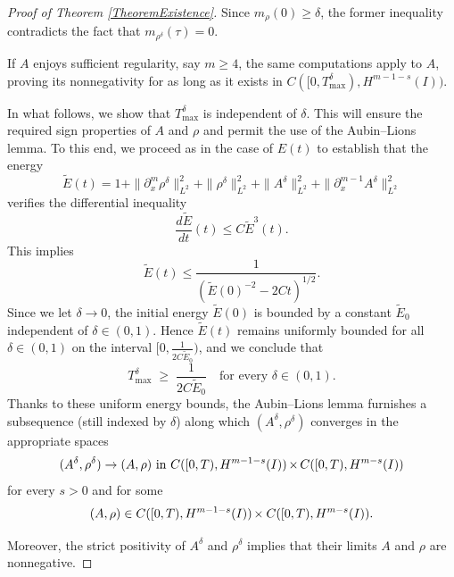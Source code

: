 \documentclass[12pt]{amsart}
\begin{document}
\begin{proof}[Proof of Theorem \ref{TheoremExistence}]
	
	Since $m_\rho(0)\geq \delta$, the former inequality contradicts the fact that $m_{\rho^\delta}(\tau)=0$.
	
	If $A$ enjoys sufficient regularity, say $m\ge4$, the same computations apply to $A$, proving its nonnegativity for as long as it exists in $C([0,T_{\max}^\delta),H^{m-1-s}(I))$. 
	

	In what follows, we show that $T_{\max}^\delta$ is independent of $\delta$. This will ensure the required sign properties of $A$ and $\rho$ and permit the use of the Aubin–Lions lemma. To this end, we proceed as in the case of $E(t)$ to establish that the energy 
	\begin{equation*}
		\tilde{E}(t)=1+\|\partial_{x}^m\rho^{\delta}\|_{L^2}^2+\|\rho^{\delta}\|_{L^2}^2+ \|A^{\delta}\|_{L^2}^2+\|\partial_x^{m-1}A^{\delta}\|_{L^2}^2
	\end{equation*}
	verifies the differential inequality
	\begin{equation*}
		\frac{d \tilde{E}}{dt}(t)\leq C \tilde{E}^3(t).
	\end{equation*}
	This implies
	\begin{equation*}
		\tilde{E}(t)\leq \frac{1}{\left( \tilde{E}(0)^{-2}-2Ct\right)^{1/2}}.
	\end{equation*}
	Since we let $\delta \to 0$, the initial energy $\tilde{E}(0)$ is bounded by a constant $\tilde{E}_0$ independent of $\delta\in(0,1)$. Hence $\tilde{E}(t)$ remains uniformly bounded for all $\delta\in(0,1)$ on the interval $\bigl[0,\tfrac{1}{2C\tilde{E}_0}\bigr)$, and we conclude that
$$
T_{\max}^\delta \;\ge\; \frac{1}{2C\tilde{E}_0}
\quad\text{for every }\delta\in(0,1).
$$
Thanks to these uniform energy bounds, the Aubin--Lions lemma furnishes a subsequence (still indexed by $\delta$) along which $(A^\delta,\rho^\delta)$ converges in the appropriate spaces
	\begin{equation}\label{Convergence2}
		(A^\delta,\rho^\delta)\to(A,\rho) \text{ in } C([0,T),H^{m-1-s}(I))\hspace{-0.03cm}\times\hspace{-0.03cm} C([0,T),H^{m-s}(I))
	\end{equation}
	for every $s>0$ and for some $$(A,\rho)\in C([0,T),H^{m-1-s}(I))\hspace{-0.03cm}\times C([0,T),H^{m-s}(I)).$$
    
    Moreover, the strict positivity of $A^\delta$ and $\rho^\delta$ implies that their limits $A$ and $\rho$ are nonnegative.	


\end{proof}
\end{document}

